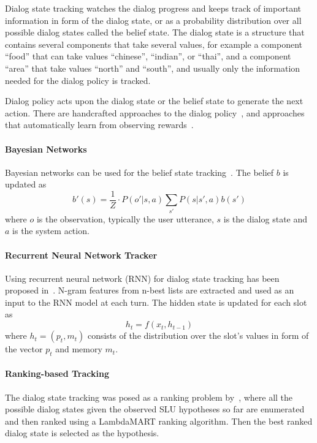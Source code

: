 \documentclass[10pt,twocolumn]{article}
\begin{document}
Dialog state tracking watches the dialog progress and keeps track of important information in form of the dialog state, or as a probability distribution over all possible dialog states called the belief state. The dialog state is a structure that contains several components that take several values, for example a component ``food'' that can take values ``chinese'', ``indian'', or ``thai'', and a component ``area'' that take values ``north'' and ``south'', and usually only the information needed for the dialog policy is tracked.

Dialog policy acts upon the dialog state or the belief state to generate the next action. There are handcrafted approaches to the dialog policy~\cite{pieraccini2005we,skantze2008galatea}, and approaches that automatically learn from observing rewards~\cite{levin2000stochastic,walker2000application,lemon2006isu,thomson2010bayesian}.

\paragraph*{Bayesian Networks}
Bayesian networks can be used for the belief state tracking~\cite{pulman1996conversational,williams2007applying,bui2006tractable,thomson2010bayesian}. The belief $b$ is updated as
$$b'(s)=\frac{1}{Z} \cdot P(o'|s,a)\sum_{s'}P(s|s',a)b(s')$$
where $o$ is the observation, typically the user utterance, $s$ is the dialog state and $a$ is the system action.

\paragraph*{Recurrent Neural Network Tracker}
Using recurrent neural network (RNN) for dialog state tracking has been proposed in~\cite{henderson2014word,henderson2013deep}. N-gram features from n-best lists are extracted and used as an input to the RNN model at each turn. The hidden state is updated for each slot as
$$h_t=f(x_t, h_{t-1})$$
where $h_t=(p_t, m_t)$ consists of the distribution over the slot's values in form of the vector $p_t$ and memory $m_t$.

\paragraph*{Ranking-based Tracking}
The dialog state tracking was posed as a ranking problem by~\cite{williams2014web}, where all the possible dialog states given the observed SLU hypotheses so far are enumerated and then ranked using a LambdaMART ranking algorithm. Then the best ranked dialog state is selected as the hypothesis.
\end{document}
